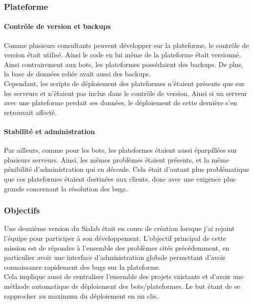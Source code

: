 \documentclass{article} %
\begin{document}
\subsubsection{Plateforme}

\paragraph{Contrôle de version et backups}
Comme plusieurs consultants peuvent développer sur la plateforme, le contrôle de version était utilisé. Ainsi le code en lui même de la plateforme était versionné. Ainsi contrairement aux bots, les plateformes possédaient des backups. De plus, la base de données reliée avait aussi des backups.\\
Cependant, les scripts de déploiement des plateformes n'étaient présents que sur les serveurs et n'étaient pas inclus dans le contrôle de version. Ainsi si un serveur avec une plateforme perdait ses données, le déploiement de cette dernière s'en retrouvait affecté. \\

\paragraph{Stabilité et administration}
Par ailleurs, comme pour les bots, les plateformes étaient aussi éparpillées sur plusieurs serveurs. Ainsi, les mêmes problèmes étaient présents, et la même pénibilité d'administration qui en découle. Cela était d'autant plus problématique que ces plateformes étaient destinées aux clients, donc avec une exigence plus grande concernant la résolution des bugs.

\subsubsection{Objectifs}
Une deuxième version du Sialab était en cours de création lorsque j'ai rejoint l'équipe pour participer à son développement. L'objectif principal de cette mission est de répondre à l'ensemble des problèmes cités précédemment, en particulier avoir une interface d'administration globale permettant d'avoir connaissance rapidement des bugs sur la plateforme.\\

Cela implique aussi de centraliser l'ensemble des projets existants et d'avoir une méthode automatique de déploiement des bots/plateformes. Le but étant de se rapprocher au maximum du déploiement en un clic.\\
\end{document}
